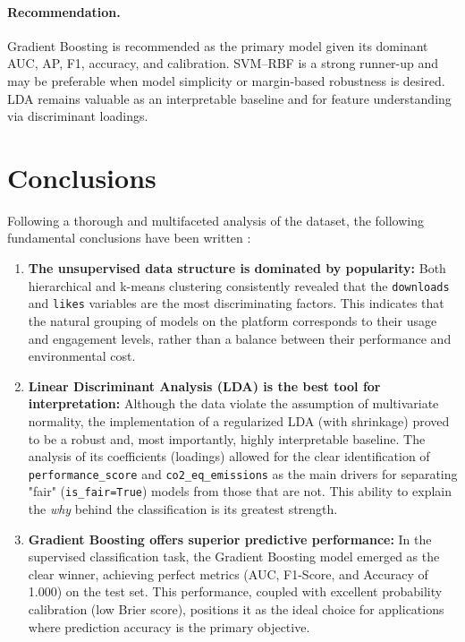 \documentclass[journal]{IEEEtran}
\begin{document}
\paragraph{Recommendation.}
Gradient Boosting is recommended as the primary model given its dominant AUC, AP,
F1, accuracy, and calibration. SVM–RBF is a strong runner-up and may be preferable
when model simplicity or margin-based robustness is desired. LDA remains valuable
as an interpretable baseline and for feature understanding via discriminant loadings.
\section*{Conclusions}

Following a thorough and multifaceted analysis of the dataset, the following fundamental conclusions have been written :

\begin{enumerate}
	\item \textbf{The unsupervised data structure is dominated by popularity:} Both hierarchical and k-means clustering consistently revealed that the \texttt{downloads} and \texttt{likes} variables are the most discriminating factors. This indicates that the natural grouping of models on the platform corresponds to their usage and engagement levels, rather than a balance between their performance and environmental cost.
	
	\item \textbf{Linear Discriminant Analysis (LDA) is the best tool for interpretation:} Although the data violate the assumption of multivariate normality, the implementation of a regularized LDA (with shrinkage) proved to be a robust and, most importantly, highly interpretable baseline. The analysis of its coefficients (loadings) allowed for the clear identification of \texttt{performance\_score} and \texttt{co2\_eq\_emissions} as the main drivers for separating "fair" (\texttt{is\_fair=True}) models from those that are not. This ability to explain the \textit{why} behind the classification is its greatest strength.
	
	\item \textbf{Gradient Boosting offers superior predictive performance:} In the supervised classification task, the Gradient Boosting model emerged as the clear winner, achieving perfect metrics (AUC, F1-Score, and Accuracy of 1.000) on the test set. This performance, coupled with excellent probability calibration (low Brier score), positions it as the ideal choice for applications where prediction accuracy is the primary objective.
\end{enumerate}


	

	
\end{document}
